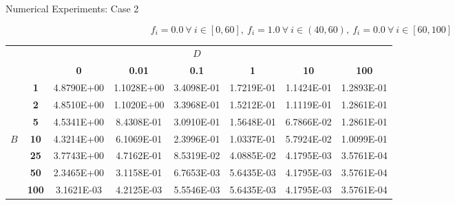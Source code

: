 \documentclass{beamer}
\begin{document}
\begin{frame}{Numerical Experiments: Case 2}

  \[
  f_i = 0.0\ \forall\ i \in [0,60],\ 
  f_i = 1.0\ \forall\ i \in (40,60),\ 
  f_i = 0.0\ \forall\ i \in [60,100]
  \]

  {\tiny
    \begin{table}[htpb!]
      \begin{center}
        \begin{tabular}{cccccccc}\hline\hline
          \multicolumn{1}{c}{} & \multicolumn{1}{c}{}&
          \multicolumn{1}{c}{}& \multicolumn{1}{c}{}&
          \multicolumn{1}{c}{$D$} & \multicolumn{1}{c}{}&
          \multicolumn{1}{c}{}& \multicolumn{1}{c}{} \\
          & & \textbf{0} & \textbf{0.01} & \textbf{0.1} & \textbf{1} &
          \textbf{10} & \textbf{100} \\
& \textbf{1} & 4.8790E+00 & 1.1028E+00 & 3.4098E-01 & 1.7219E-01 & 1.1424E-01 &
1.2893E-01 \\
& \textbf{2} & 4.8510E+00 & 1.1020E+00 & 3.3968E-01 & 1.5212E-01 & 1.1119E-01 &
1.2861E-01 \\
& \textbf{5} & 4.5341E+00 & 8.4308E-01 & 3.0910E-01 & 1.5648E-01 & 6.7866E-02 &
1.2861E-01 \\
$B$ & \textbf{10} & 4.3214E+00 & 6.1069E-01 & 2.3996E-01 & 1.0337E-01 & 5.7924E-02 &
1.0099E-01 \\
& \textbf{25} & 3.7743E+00 & 4.7162E-01 & 8.5319E-02 & 4.0885E-02 & 4.1795E-03 &
3.5761E-04 \\
& \textbf{50} & 2.3465E+00 & 3.1158E-01 & 6.7653E-03 & 5.6435E-03 & 4.1795E-03 &
3.5761E-04 \\
& \textbf{100} & 3.1621E-03 & 4.2125E-03 & 5.5546E-03 & 5.6435E-03 & 4.1795E-03 &
3.5761E-04 \\
          \hline\hline
        \end{tabular}
      \end{center}
    \end{table}
  }

\end{frame}
\end{document}
